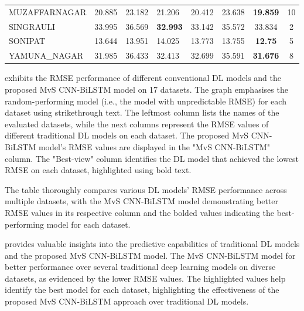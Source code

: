 \documentclass[a4paper, fleqn]{cas-sc}
\theoremstyle{definition}
\theoremstyle{remark}
\begin{document}
\begin{table}[]
{\begin{tabular}{llllllcc}
 MUZAFFARNAGAR  & 20.885          & 23.182    & 21.206          & 20.412     & 23.638                   & \textbf{19.859} & 10     \\
 SINGRAULI      & 33.995          & 36.569    & \textbf{32.993} & 33.142     & 35.572                    & 33.834          & 2      \\
 SONIPAT        & 13.644          & 13.951    & 14.025          & 13.773     & 13.755                    & \textbf{12.75}  & 5      \\
 YAMUNA\_NAGAR  & 31.985          & 36.433    & 32.413          & 32.699     & 35.591                    & \textbf{31.676} & 8     \\ \hline
  \end{tabular}%
  }
  \end{table}
   exhibits the RMSE performance of different conventional DL models and the proposed MvS CNN-BiLSTM model on 17 datasets. The graph emphasises the random-performing model (i.e.,  the model with unpredictable RMSE) for each dataset using strikethrough text. The leftmost column lists the names of the evaluated datasets,  while the next columns represent the RMSE values of different traditional DL models on each dataset. The proposed MvS CNN-BiLSTM model's RMSE values are displayed in the "MvS CNN-BiLSTM" column. The "Best-view" column identifies the DL model that achieved the lowest RMSE on each dataset,  highlighted using bold text.

  The table thoroughly compares various DL models' RMSE performance across multiple datasets,  with the MvS CNN-BiLSTM model demonstrating better RMSE values in its respective column and the bolded values indicating the best-performing model for each dataset.
  
   provides valuable insights into the predictive capabilities of traditional DL models and the proposed MvS CNN-BiLSTM model. The MvS CNN-BiLSTM model for better performance over several traditional deep learning models on diverse datasets,  as evidenced by the lower RMSE values. The highlighted values help identify the best model for each dataset,  highlighting the effectiveness of the proposed MvS CNN-BiLSTM approach over traditional DL models.
\end{document}
